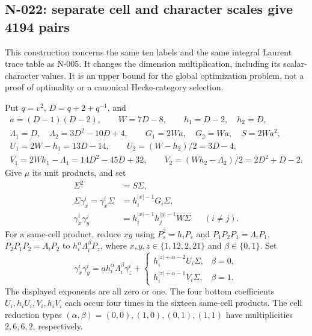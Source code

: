 \subsection{N-022: separate cell and character scales give 4194 pairs}

This construction concerns the same ten labels and the same integral
Laurent trace table as N-005.  It changes the dimension multiplication,
including its scalar-character values.  It is an upper bound for the
global optimization problem, not a proof of optimality or a canonical
Hecke-category selection.

Put $q=v^2$, $D=q+2+q^{-1}$, and
\[
\begin{gathered}
 a=(D-1)(D-2),\qquad W=7D-8,\qquad h_1=D-2,\quad h_2=D,\\
 \Lambda_1=D,\quad\Lambda_2=3D^2-10D+4,\qquad
 G_1=2Wa,\quad G_2=Wa,\quad S=2Wa^2,\\
 U_1=2W-h_1=13D-14,\qquad U_2=(W-h_2)/2=3D-4,\\
 V_1=2Wh_1-\Lambda_1=14D^2-45D+32,\qquad
 V_2=(Wh_2-\Lambda_2)/2=2D^2+D-2.
\end{gathered}\tag{N-127}
\]
Give $\mu$ its unit products, and set
\[
\begin{aligned}
 \Sigma^2&=S\Sigma,\\
 \Sigma\gamma^i_x=\gamma^i_x\Sigma&=h_i^{|x|-1}G_i\Sigma,\\
 \gamma^i_x\gamma^j_y&=h_i^{|x|-1}h_j^{|y|-1}W\Sigma
       &&(i\ne j).
\end{aligned}\tag{N-128}
\]
For a same-cell product, reduce $xy$ using $P_s^2=h_iP_s$ and
$P_1P_2P_1=\Lambda_iP_1$, $P_2P_1P_2=\Lambda_iP_2$ to
$h_i^\alpha\Lambda_i^\beta P_z$, where
$x,y,z\in\{1,12,2,21\}$ and $\beta\in\{0,1\}$.  Set
\[
 \gamma^i_x\gamma^i_y=a h_i^\alpha\Lambda_i^\beta\gamma^i_z+
 \begin{cases}
 h_i^{|z|+\alpha-2}U_i\Sigma,&\beta=0,\\
 h_i^{|z|+\alpha-1}V_i\Sigma,&\beta=1.
 \end{cases}\tag{N-129}
\]
The displayed exponents are all zero or one.  The four bottom
coefficients $U_i,h_iU_i,V_i,h_iV_i$ each occur four times in the
sixteen same-cell products.  The cell reduction types
$(\alpha,\beta)=(0,0),(1,0),(0,1),(1,1)$ have multiplicities
$2,6,6,2$, respectively.

